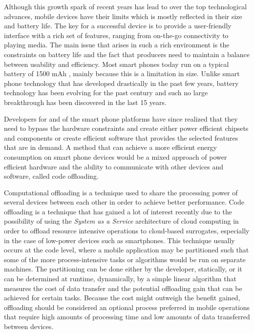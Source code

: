 Although this growth spark of recent years has lead to over the top technological advances, mobile devices have their limits which is mostly reflected in their size and battery life. The key for a successful device is to provide a user-friendly interface with a rich set of features, ranging from on-the-go connectivity to playing media. The main issue that arises in such a rich environment is the constraints on battery life and the fact that producers need to maintain a balance between usability and efficiency. Most smart phones today run on a typical battery of 1500 mAh \cite{understandingBattery}, mainly because this is a limitation in size. Unlike smart phone technology that has developed drastically in the past few years, battery technology has been evolving for the past century and such no large breakthrough has been discovered in the last 15 years\cite{batteryLife}.


Developers for and of the smart phone platforms have since realized that they need to bypass the hardware constraints and create either power efficient chipsets and components or create efficient software that provides the selected features that are in demand. A method that can achieve a more efficient energy consumption on smart phone devices would be a mixed approach of power efficient hardware and the ability to communicate with other devices and software, called code offloading.


Computational offloading is a technique used to share the processing power of several devices between each other in order to achieve better performance. Code offloading is a technique that has gained a lot of interest recently due to the possibility of using the \textit{System as a Service} architecture of cloud computing in order to offload resource intensive operations to cloud-based surrogates\cite{shiraz2013review}, especially in the case of low-power devices such as smartphones. This technique usually occurs at the code level, where a mobile application may be partitioned such that some of the more process-intensive tasks or algorithms would be run on separate machines. The partitioning can be done either by the developer, statically, or it can be determined at runtime, dynamically, by a simple linear algorithm that measures the cost of data transfer and the potential offloading gain that can be achieved for certain tasks. Because the cost might outweigh the benefit gained, offloading should be considered an optional process preferred in mobile operations that require high amounts of processing time and low amounts of data transferred between devices\cite{kumar2010cloud}.




